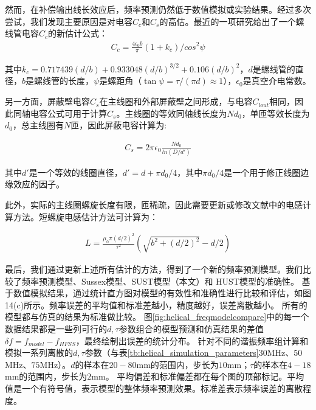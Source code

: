 然而，在补偿输出线长效应后，频率预测仍然低于数值模拟或实验结果。经过多次尝试，我们发现主要原因是对电容$C_c$和$C_s$的高估。最近的一项研究\cite[p52,f5.3]{article_2010}给出了一个螺线管电容$C_c$的新估计公式：
\begin{align}
    C_c=\frac{4\epsilon_0 b}{\pi}(1+k_c)/cos^2\psi 	\label{eq:helical_C_c_new}
\end{align}

其中$k_c=0.717439(d/b)+0.933048(d/b)^{3/2}+0.106(d/b)^2$，$d$是螺线管的直径，$b$是螺线管的长度，$\psi$是螺距角（$\tan\psi=\tau/(\pi d)\approx 1$），$\epsilon_0$是真空介电常数。

另一方面，屏蔽壁电容$C_s$在主线圈和外部屏蔽壁之间形成，与电容$C_{lout}$相同，因此同轴电容公式可用于计算$C_s$。主线圈的等效同轴线长度为$Nd_0$，单匝等效长度为$d_0$，总主线圈有$N$匝，因此屏蔽电容计算为:

\begin{align}
    C_s=2\pi\epsilon_0 \frac{Nd_0}{ln(D/d')} \label{eq:helical_C_s_new}
\end{align}

其中$d'$是一个等效的线圈直径，$d'=d+\pi d_0/4$，其中$\pi d_0/4$是一个用于修正线圈边缘效应的因子。

此外，实际的主线圈螺旋长度有限，匝稀疏，因此需要更新或修改文献\cite[]{Siverns_Simkins_Weidt_Hensinger_2012}中的电感计算方法。短螺旋电感估计方法可计算为：

\begin{align}
    L=\frac{\mu_0 \pi (d/2)^2 }{\tau^2} (\sqrt{b^2+(d/2)^2}-d/2) \label{eq:helical_L_new}
\end{align}

最后，我们通过更新上述所有估计的方法，得到了一个新的频率预测模型。我们比较了频率预测模型、Sussex模型\cite[]{Siverns_Simkins_Weidt_Hensinger_2012}、SUST模型（本文）和 HUST模型\cite[]{Deng_Sun_Yuan_Xu_Zhang_Lu_Luo_2014}的准确性。
基于数值模拟结果，通过统计直方图对模型的有效性和准确性进行比较和评估，如图14(c)所示。频率误差的平均值和标准差越小，精度越好，误差离散越小。
所有的模型都与仿真的结果为标准做比较。
图\ref{fig:helical_freqmodelcompare}中的每一个数据结果都是一些列可行的$d,\tau$参数组合的模型预测和仿真结果的差值$\delta f=f_{model}-f_{HFSS}$，最终绘制出误差的统计分布。
针对不同的谐振频率组计算和模拟一系列离散的$d,\tau$参数（与表\ref{tb:helical_simulation_parameters}$30$MHz、$50$MHz、$75$MHz）。$d$的样本在$20-80$mm的范围内，步长为$10$mm；$\tau$的样本在$4-18$mm的范围内，步长为$2$mm。
平均偏差和标准偏差都在每个图的顶部标记。平均值是一个有符号值，表示模型的整体频率预测效果。标准差表示频率误差的离散程度。

